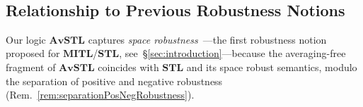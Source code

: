 \documentclass[envcountsect,orivec]{llncs} \usepackage{etex} \usepackage[]{graphicx}
\newif\ifignore \ignorefalse
\newcommand{\auxproof}[1]{
  \ifignore\mbox{}\newline
  \textbf{BEGIN: AUX-PROOF} \dotfill\newline
  {#1}\mbox{}\newline
  \textbf{END: AUX-PROOF}\dotfill\newline
  \fi}
\newcommand{\STL}{\textbf{STL}}
\newcommand{\AvSTL}{\textbf{AvSTL}}
\begin{document}
　

























































  
















































\subsection{Relationship to Previous Robustness Notions}
Our logic $\AvSTL$ captures 
\emph{space robustness}~\cite{DBLP:journals/tcs/FainekosP09}---the
first robustness notion  proposed for $\textbf{MITL}$/$\STL$,
see~\S\ref{sec:introduction}---because the averaging-free fragment of $\AvSTL$ coincides with
$\STL$ and its space robust semantics, modulo the separation of positive
and negative robustness (Rem.~\ref{rem:separationPosNegRobustness}).
\auxproof{
More precisely,
the positive robustness of an averaged-free $\AvSTL$ formula $\varphi$
corresponds to 
the space robustness in $\STL$
if $\varphi$ is (qualitatively) true,
and so does the negative one if $\varphi$ is false.
}
\end{document}
